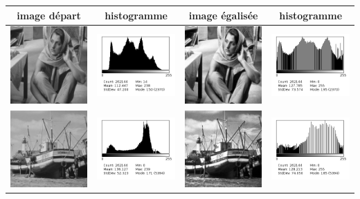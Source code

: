 \documentclass[a4paper,11pt]{article}
\begin{document}
  \begin{tabular}{|c|c|c|c|}
   \hline
   image départ & histogramme & image égalisée & histogramme\\
   \hline
   \includegraphics[width=3cm]{barb.png} & \includegraphics[width=3cm]{../histo/image/hist_barb.png} & \includegraphics[width=3cm]{../res/barbQ3.png} & \includegraphics[width=3cm]{../histo/resultat/barbQ3.png}\\
   \hline
   \includegraphics[width=3cm]{boat.png} & \includegraphics[width=3cm]{../histo/image/hist_boat.png} & \includegraphics[width=3cm]{../res/boatQ3.png} & \includegraphics[width=3cm]{../histo/resultat/boatQ3.png}\\

\end{tabular}
\end{document}

